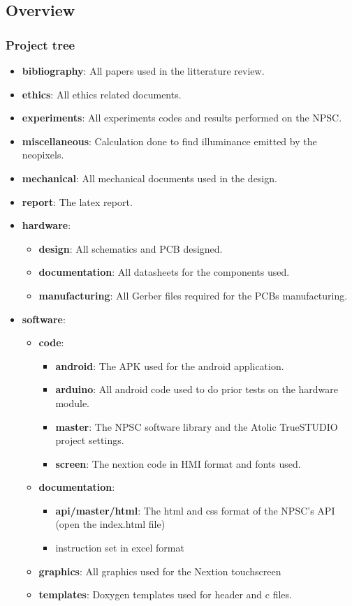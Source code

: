 \subsection{Overview}
\subsubsection{Project tree}
\begin{itemize}
	\item \textbf{bibliography}: All papers used in the litterature review.
	\item \textbf{ethics}: All ethics related documents.
	\item \textbf{experiments}: All experiments codes and results performed on the NPSC.
	\item \textbf{miscellaneous}: Calculation done to find illuminance emitted by the neopixels.
	\item \textbf{mechanical}: All mechanical documents used in the design.
	\item \textbf{report}: The latex report.
	\item \textbf{hardware}: \label{npsc_harware}
	\begin{itemize}
		\item \textbf{design}: All schematics and PCB designed.
		\item \textbf{documentation}: All datasheets for the components used.
		\item \textbf{manufacturing}: All Gerber files required for the PCBs manufacturing.
	\end{itemize}
	\item \textbf{software}: \label{npsc_software}
	\begin{itemize}
		\item \textbf{code}:
		\begin{itemize}
			\item \textbf{android}: The APK used for the android application.
			\item \textbf{arduino}: All android code used to do prior tests on the hardware module.
			\item \textbf{master}: The NPSC software library and the Atolic TrueSTUDIO project settings.
			\item \textbf{screen}: The nextion code in HMI format and fonts used.
		\end{itemize}
		\item \textbf{documentation}:
		\begin{itemize}
			\item \textbf{api/master/html}: The html and css format of the NPSC's API (open the index.html file)
			\item instruction set in excel format 
		\end{itemize}
		\item \textbf{graphics}: All graphics used for the Nextion touchscreen
		\item \textbf{templates}: Doxygen templates used for header and c files.
	\end{itemize}
\end{itemize}


